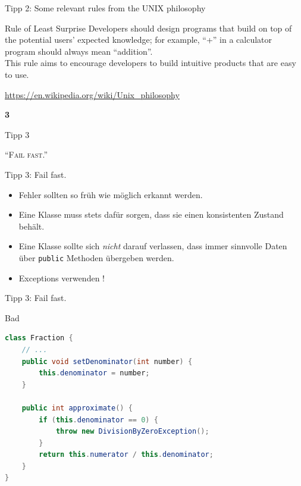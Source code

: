 \documentclass[18pt]{beamer}
\newcommand{\quotes}[1]{``#1''}
\begin{document}
\begin{frame}{Tipp 2: Some relevant rules from the UNIX philosophy}
    \begin{exampleblock}{Rule of Least Surprise}
        Developers should design programs that build on top of the potential users' expected knowledge; for example,
        \quotes{+} in a calculator program should always mean \quotes{addition}.\\
        This rule aims to encourage developers to build intuitive products that are easy to use.
    \end{exampleblock}
    \vspace{.2in}
    \url{https://en.wikipedia.org/wiki/Unix_philosophy}
\end{frame}

\begin{frame}{\quad}
    \center
    \Huge{\textbf{3}}
\end{frame}

\begin{frame}{Tipp 3}
    \begin{block}{}
        \center
        \textsc{\quotes{Fail fast.}}
    \end{block}
\end{frame}

\begin{frame}{Tipp 3: Fail fast.}
    \begin{itemize}
        \item Fehler sollten so früh wie möglich erkannt werden.
        \item Eine Klasse muss stets dafür sorgen, dass sie einen konsistenten Zustand behält.
        \item Eine Klasse sollte sich \textit{nicht} darauf verlassen, dass immer sinnvolle Daten über \texttt{public} Methoden übergeben werden.
        \item Exceptions verwenden !
    \end{itemize}
\end{frame}

\begin{frame}[fragile]{Tipp 3: Fail fast.}
        \begin{alertblock}{Bad}
            \begin{lstlisting}[language=Java,basicstyle=\scriptsize]
class Fraction {
    // ...
    public void setDenominator(int number) {
        this.denominator = number;
    }

    public int approximate() {
        if (this.denominator == 0) {
            throw new DivisionByZeroException();
        }
        return this.numerator / this.denominator;
    }
}
            \end{lstlisting}
        \end{alertblock}
\end{frame}
\end{document}
